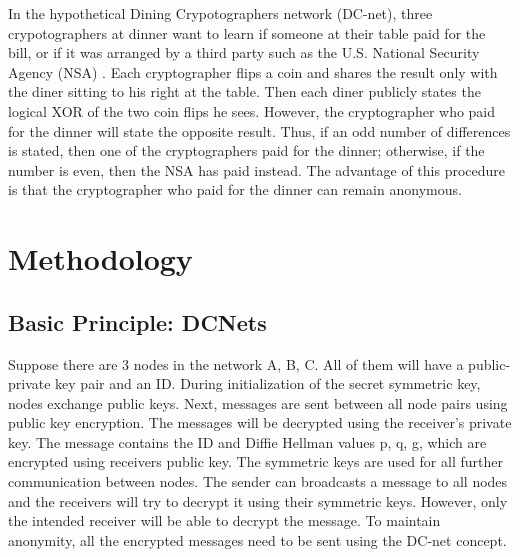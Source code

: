 \documentclass{acm_proc_article-sp}
\begin{document}
In the hypothetical Dining Crypotographers network (DC-net), three crypotographers at dinner want to learn if someone at their table paid for the bill, or if it was arranged by a third party such as the U.S. National Security Agency (NSA) \cite{chaum}. Each cryptographer flips a coin and shares the result only with the diner sitting to his right at the table. Then each diner publicly states the logical XOR of the two coin flips he sees. However, the cryptographer who paid for the dinner will state the opposite result. Thus, if an odd number of differences is stated, then one of the cryptographers paid for the dinner; otherwise, if the number is even, then the NSA has paid instead. The advantage of this procedure is that the cryptographer who paid for the dinner can remain anonymous.
 
\section{Methodology}
\vspace{1 mm}

\subsection{Basic Principle: DCNets}

Suppose there are 3 nodes in the network A, B, C. All of them will have a public-private key pair and an ID. During initialization of the secret symmetric key, nodes exchange public keys. Next, messages are sent between all node pairs using public key encryption. The messages will be decrypted using the receiver's private key. The message contains the ID and Diffie Hellman values p, q, g, which are encrypted using receivers public key. The symmetric keys are used for all further communication between nodes. The sender can broadcasts a message to all nodes and the receivers will try to decrypt it using their symmetric keys. However, only the intended receiver will be able to decrypt the message. To maintain anonymity, all the encrypted messages need to be sent using the DC-net concept.
\end{document}
